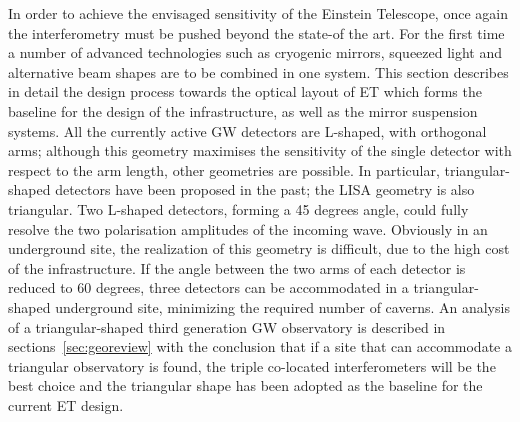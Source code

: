 In order to achieve the envisaged sensitivity of the Einstein
Telescope, once again the interferometry must be pushed beyond
the state-of the art. For the first time a number of advanced
technologies such as cryogenic mirrors, squeezed light and 
alternative beam shapes are to be combined in one system.
This section describes in detail the design process towards the
optical layout of ET which forms the baseline for the design of the
infrastructure, as well as the mirror suspension systems.
All the currently active GW detectors are L-shaped, with orthogonal
arms; although this geometry maximises the sensitivity of the single
detector with respect to the arm length, other geometries are
possible. In particular, triangular-shaped detectors have been
proposed in the past; the LISA geometry is also triangular.
 Two L-shaped
detectors, forming a 45 degrees angle, could fully resolve the two
polarisation amplitudes of the incoming wave. Obviously in an
underground site, the realization of this geometry is
difficult, due to the high cost of the infrastructure. If the angle
between the two arms of each
detector is reduced to 60 degrees, three detectors can be accommodated
in a triangular-shaped underground site, minimizing the required
number
of caverns. An
analysis of a triangular-shaped
third generation GW observatory is described in
sections~\ref{sec:georeview}
with the conclusion that if a site that can
accommodate a triangular observatory is found, 
the triple co-located interferometers will be the best choice and the
triangular shape has been adopted as the baseline for the current
ET design.

